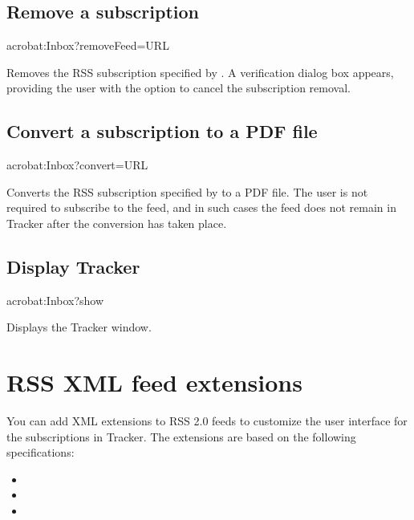 \documentclass[letterpaper,12pt,english,openany,oneside]{sphinxmanual}
\begin{document}
\subsection{Remove a subscription}
\label{\detokenize{Tracker_InboxAPI:remove-a-subscription}}
\begin{sphinxVerbatim}[commandchars=\\\{\}]
acrobat:Inbox?removeFeed=\PYGZlt{}URL\PYGZgt{}
\end{sphinxVerbatim}

Removes the RSS subscription specified by . A verification dialog box appears, providing the user with the option to cancel the subscription removal.




\subsection{Convert a subscription to a PDF file}
\label{\detokenize{Tracker_InboxAPI:convert-a-subscription-to-a-pdf-file}}
\begin{sphinxVerbatim}[commandchars=\\\{\}]
acrobat:Inbox?convert=\PYGZlt{}URL\PYGZgt{}
\end{sphinxVerbatim}

Converts the RSS subscription specified by  to a PDF file. The user is not required to subscribe to the feed, and in such cases the feed does not remain in Tracker after the conversion has taken place.




\subsection{Display Tracker}
\label{\detokenize{Tracker_InboxAPI:display-tracker}}
\begin{sphinxVerbatim}[commandchars=\\\{\}]
acrobat:Inbox?show
\end{sphinxVerbatim}

Displays the Tracker window.




\section{RSS XML feed extensions}
\label{\detokenize{Tracker_InboxAPI:rss-xml-feed-extensions}}
You can add XML extensions to RSS 2.0 feeds to customize the user interface for the subscriptions in Tracker. The extensions are based on the following specifications:
\begin{itemize}
\item {} 

\item {} 

\item {} 

\end{itemize}
\end{document}
